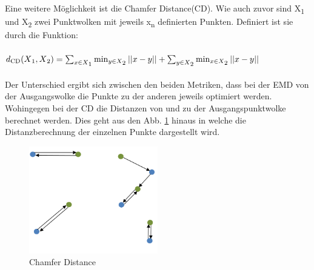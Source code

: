 \documentclass{llncs}
\begin{document}
Eine weitere Möglichkeit ist die Chamfer Distance(CD). Wie auch zuvor sind  X\textsubscript{1} und X\textsubscript{2} zwei Punktwolken mit jeweils x\textsubscript{n} definierten Punkten\cite{autoencoderloss}. Definiert ist sie durch die Funktion:
\\\\
\begin{math}
d\textsubscript{CD}(X\textsubscript{1},X\textsubscript{2})=\sum_{x\in X\textsubscript{1}} \min_{y \in X\textsubscript{2}}||x-y|| + \sum_{y\in X\textsubscript{2}} \min_{x \in X\textsubscript{2}}||x-y||
\end{math}
\\\\
Der Unterschied ergibt sich zwischen den beiden Metriken, dass bei der EMD von der Ausgangswolke die Punkte zu der anderen jeweils optimiert werden. Wohingegen bei der CD die Distanzen von und zu der Ausgangspunktwolke berechnet werden. Dies geht aus den Abb. \ref{fig:Bild15} hinaus in welche die Distanzberechnung der einzelnen Punkte dargestellt wird\cite{autoencoderloss}.

\begin{figure}[htbp] 
	\centering
	\includegraphics[width=0.5\textwidth]{champfer.png}
	\caption{Chamfer Distance}
	\label{fig:Bild15}
\end{figure} 
\newpage
\end{document}
